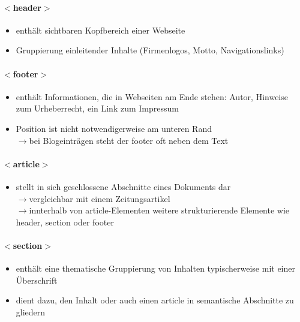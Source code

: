 \documentclass[10pt,a4paper]{article}
\begin{document}
\paragraph{$<$header$>$}
\begin{itemize}[noitemsep,topsep=0pt,leftmargin=*]
    \item enthält sichtbaren Kopfbereich einer Webseite
    \item Gruppierung einleitender Inhalte (Firmenlogos, Motto, Navigationslinks)
\end{itemize}

\paragraph{$<$footer$>$}
\begin{itemize}[noitemsep,topsep=0pt,leftmargin=*]
    \item enthält Informationen, die in Webseiten am Ende stehen: Autor, Hinweise zum Urheberrecht, ein Link zum Impressum
    \item Position ist nicht notwendigerweise am unteren Rand\\
    $\rightarrow$bei Blogeinträgen steht der footer oft neben dem Text
\end{itemize}

\paragraph{$<$article$>$}
\begin{itemize}[noitemsep,topsep=0pt,leftmargin=*]
    \item stellt in sich geschlossene Abschnitte eines Dokuments dar\\
    $\rightarrow$vergleichbar mit einem Zeitungsartikel\\
    $\rightarrow$innterhalb von article-Elementen weitere strukturierende Elemente wie header, section oder footer
\end{itemize}

\paragraph{$<$section$>$}
\begin{itemize}[noitemsep,topsep=0pt,leftmargin=*]
    \item enthält eine thematische Gruppierung von Inhalten typischerweise mit einer Überschrift
    \item dient dazu, den Inhalt oder auch einen article in semantische Abschnitte zu gliedern
\end{itemize}
\end{document}
